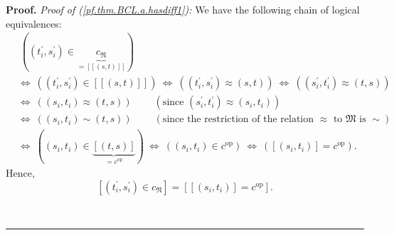 \documentclass
[numbers=enddot,12pt,final,onecolumn,notitlepage,abstracton]{scrartcl}%
\theoremstyle{definition}
\newenvironment{proof}[1][Proof]{\noindent\textbf{#1.} }{\ \rule{0.5em}{0.5em}}
\begin{document}
\begin{proof}
\textit{Proof of (\ref{pf.thm.BCL.a.hasdiff1}):} We have the following chain
of logical equivalences:%
\begin{align*}
&  \ \left(  \left(  t_{i}^{\prime},s_{i}^{\prime}\right)  \in
\underbrace{c_{\mathfrak{N}}}_{=\left[  \left[  \left(  s,t\right)  \right]
\right]  }\right) \\
&  \Longleftrightarrow\ \left(  \left(  t_{i}^{\prime},s_{i}^{\prime}\right)
\in\left[  \left[  \left(  s,t\right)  \right]  \right]  \right)
\ \Longleftrightarrow\ \left(  \left(  t_{i}^{\prime},s_{i}^{\prime}\right)
\approx\left(  s,t\right)  \right)  \ \Longleftrightarrow\ \left(  \left(
s_{i}^{\prime},t_{i}^{\prime}\right)  \approx\left(  t,s\right)  \right) \\
&  \Longleftrightarrow\ \left(  \left(  s_{i},t_{i}\right)  \approx\left(
t,s\right)  \right)  \ \ \ \ \ \ \ \ \ \ \left(  \text{since }\left(
s_{i}^{\prime},t_{i}^{\prime}\right)  \approx\left(  s_{i},t_{i}\right)
\right) \\
&  \Longleftrightarrow\ \left(  \left(  s_{i},t_{i}\right)  \sim\left(
t,s\right)  \right)  \ \ \ \ \ \ \ \ \ \ \left(  \text{since the restriction
of the relation }\approx\text{ to }\mathfrak{M}\text{ is }\sim\right) \\
&  \Longleftrightarrow\ \left(  \left(  s_{i},t_{i}\right)  \in
\underbrace{\left[  \left(  t,s\right)  \right]  }_{=c^{\operatorname*{op}}%
}\right)  \ \Longleftrightarrow\ \left(  \left(  s_{i},t_{i}\right)  \in
c^{\operatorname*{op}}\right)  \ \Longleftrightarrow\ \left(  \left[  \left(
s_{i},t_{i}\right)  \right]  =c^{\operatorname*{op}}\right)  .
\end{align*}
Hence,%
\begin{equation}
\left[  \left(  t_{i}^{\prime},s_{i}^{\prime}\right)  \in c_{\mathfrak{N}%
}\right]  =\left[  \left[  \left(  s_{i},t_{i}\right)  \right]
=c^{\operatorname*{op}}\right]  . \label{pf.thm.BCL.a.hasdiff1.eq1}%
\end{equation}



\end{proof}
\end{document}
